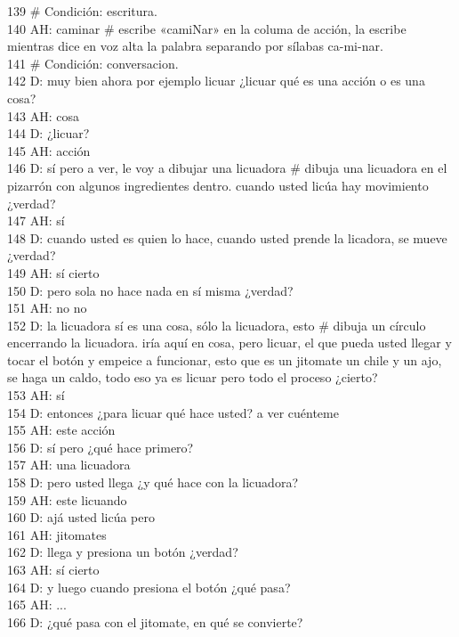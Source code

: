 139 \# Condición: escritura.\\
140 AH: caminar \# escribe «camiNar» en la columa de acción, la escribe mientras dice en voz alta la palabra separando por sílabas ca-mi-nar.\\
141 \# Condición: conversacion.\\
142 D: muy bien ahora por ejemplo licuar ¿licuar qué es una acción o es una cosa?\\
143 AH: cosa\\
144 D: ¿licuar?\\
145 AH: acción\\
146 D: sí pero a ver, le voy a dibujar una licuadora \# dibuja una licuadora en el pizarrón con algunos ingredientes dentro. cuando usted licúa hay movimiento ¿verdad?\\
147 AH: sí\\
148 D: cuando usted es quien lo hace, cuando usted prende la licadora, se mueve ¿verdad?\\
149 AH: sí cierto\\
150 D: pero sola no hace nada en sí misma ¿verdad?\\
151 AH: no no\\
152 D: la licuadora sí es una cosa, sólo la licuadora, esto \# dibuja un círculo encerrando la licuadora. iría aquí en cosa, pero licuar, el que pueda usted llegar y tocar el botón y empeice a funcionar, esto que es un jitomate un chile y un ajo, se haga un caldo, todo eso ya es licuar pero todo el proceso ¿cierto?\\
153 AH: sí\\
154 D: entonces ¿para licuar qué hace usted? a ver cuénteme\\
155 AH: este acción\\
156 D: sí pero ¿qué hace primero?\\
157 AH: una licuadora\\
158 D: pero usted llega ¿y qué hace con la licuadora?\\
159 AH: este licuando\\
160 D: ajá usted licúa pero\\
161 AH: jitomates\\
162 D: llega y presiona un botón ¿verdad?\\
163 AH: sí cierto\\
164 D: y luego cuando presiona el botón ¿qué pasa?\\
165 AH: ...\\
166 D: ¿qué pasa con el jitomate, en qué se convierte?\\
